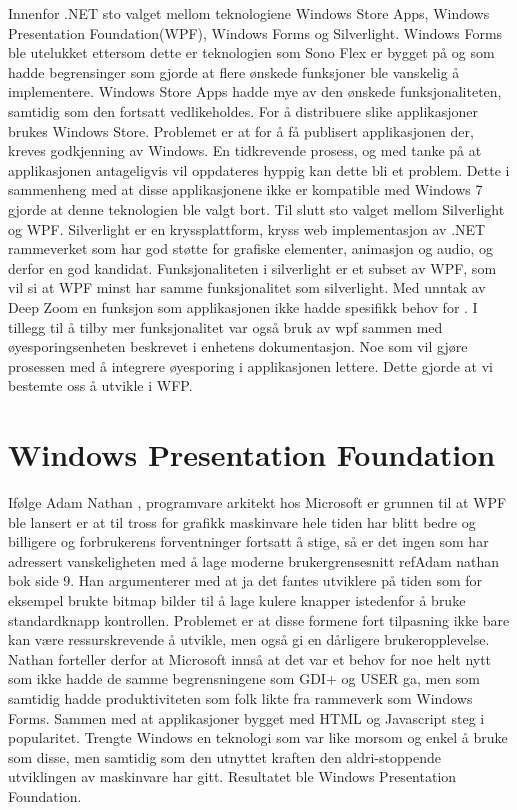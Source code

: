  
Innenfor .NET sto valget mellom teknologiene Windows Store Apps, Windows Presentation Foundation(\gls{WPF}), Windows Forms og Silverlight.  Windows Forms ble utelukket ettersom dette er teknologien som Sono Flex er bygget på og som hadde begrensinger som gjorde at flere ønskede funksjoner ble vanskelig å implementere. Windows Store Apps hadde mye av den ønskede funksjonaliteten, samtidig som den fortsatt vedlikeholdes. For å distribuere slike applikasjoner brukes Windows Store. Problemet er at for å få publisert applikasjonen der, kreves godkjenning av Windows. En tidkrevende prosess, og med tanke på at applikasjonen antageligvis vil oppdateres hyppig kan dette bli et problem. Dette i sammenheng med at disse applikasjonene ikke er kompatible med Windows 7\cite{Windo0:online} gjorde at denne teknologien ble valgt bort. Til slutt sto valget mellom Silverlight og WPF. Silverlight er en kryssplattform, kryss web implementasjon av .NET rammeverket som har god støtte for grafiske elementer, animasjon og audio, og derfor en god kandidat. Funksjonaliteten i silverlight er et subset av WPF, som vil si at WPF minst har samme funksjonalitet som silverlight. Med unntak av Deep Zoom en funksjon som applikasjonen ikke hadde spesifikk behov for \cite{WPFvsSilverlight:online}. I tillegg til å tilby mer funksjonalitet var også bruk av wpf sammen med øyesporingsenheten beskrevet i enhetens dokumentasjon. Noe som vil gjøre prosessen med å integrere øyesporing i applikasjonen lettere. Dette gjorde at vi bestemte oss å utvikle i WFP. 
 
 
 
 
\section{Windows Presentation Foundation} 
 
 
Ifølge Adam Nathan \cite[p.~9]{WPFbook}, programvare arkitekt hos Microsoft er grunnen til at WPF ble lansert er at til tross for grafikk maskinvare hele tiden har blitt bedre og billigere og  forbrukerens forventninger fortsatt å stige, så er det ingen som har adressert vanskeligheten med å lage moderne brukergrensesnitt ref{Adam nathan bok side 9}.  Han argumenterer med at ja det fantes utviklere på tiden som for eksempel brukte bitmap bilder til å lage kulere knapper istedenfor å bruke standardknapp kontrollen. Problemet er at disse formene fort tilpasning ikke bare kan være ressurskrevende å utvikle, men også gi en dårligere brukeropplevelse. Nathan forteller derfor at Microsoft innså at det var et behov for noe helt nytt som ikke hadde de samme begrensningene som GDI+ og USER ga, men som samtidig hadde produktiviteten som folk likte fra rammeverk som Windows Forms. Sammen med at applikasjoner bygget med HTML og Javascript steg i popularitet. Trengte Windows en teknologi som var like morsom og enkel å bruke som disse, men samtidig som den utnyttet kraften den aldri-stoppende utviklingen av maskinvare har gitt. Resultatet ble Windows Presentation Foundation. 
 
